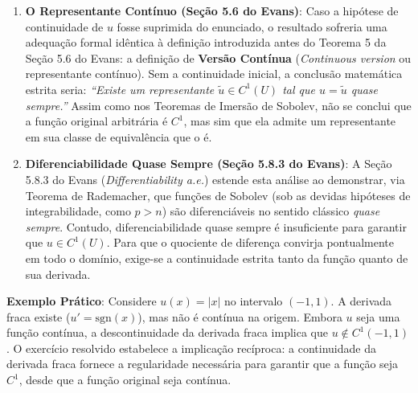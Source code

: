 \documentclass[cs_edp_2026.1.tex]{subfiles} %
\begin{document}
{\begin{enumerate}
		\item \textbf{O Representante Contínuo (Seção 5.6 do Evans)}:
		Caso a hipótese de continuidade de $u$ fosse suprimida do enunciado, o resultado sofreria uma adequação formal idêntica à definição introduzida antes do Teorema 5 da Seção 5.6 do Evans: a definição de \textbf{Versão Contínua} (\textit{Continuous version} ou representante contínuo).
		Sem a continuidade inicial, a conclusão matemática estrita seria: \textit{``Existe um representante $\tilde{u} \in C^1(U)$ tal que $u = \tilde{u}$ quase sempre.''} 
		Assim como nos Teoremas de Imersão de Sobolev, não se conclui que a função original arbitrária é $C^1$, mas sim que ela admite um representante em sua classe de equivalência que o é.
		
		\item \textbf{Diferenciabilidade Quase Sempre (Seção 5.8.3 do Evans)}:
		A Seção 5.8.3 do Evans (\textit{Differentiability a.e.}) estende esta análise ao demonstrar, via Teorema de Rademacher, que funções de Sobolev (sob as devidas hipóteses de integrabilidade, como $p > n$) são diferenciáveis no sentido clássico \textit{quase sempre}. Contudo, diferenciabilidade quase sempre é insuficiente para garantir que $u \in C^1(U)$. Para que o quociente de diferença convirja pontualmente em todo o domínio, exige-se a continuidade estrita tanto da função quanto de sua derivada.
	\end{enumerate}
	
	\textbf{Exemplo Prático}: Considere $u(x) = |x|$ no intervalo $(-1, 1)$. A derivada fraca existe ($u' = \text{sgn}(x)$), mas não é contínua na origem. Embora $u$ seja uma função contínua, a descontinuidade da derivada fraca implica que $u \notin C^1(-1, 1)$. O exercício resolvido estabelece a implicação recíproca: a continuidade da derivada fraca fornece a regularidade necessária para garantir que a função seja $C^1$, desde que a função original seja contínua.
}

\end{document}
